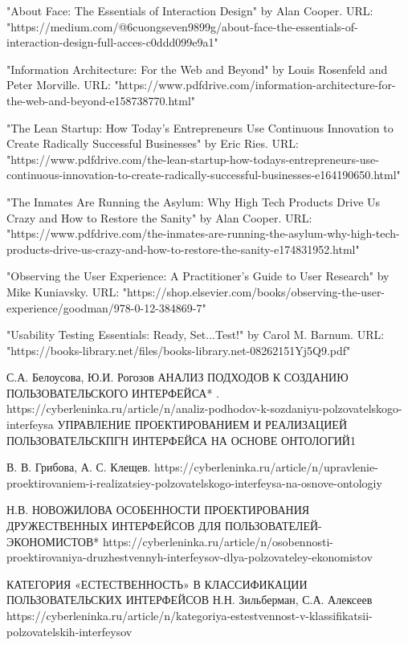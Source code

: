\documentclass{article}
\begin{document}
"About Face: The Essentials of Interaction Design" by Alan Cooper. URL: "https://medium.com/@6cuongseven9899g/about-face-the-essentials-of-interaction-design-full-acces-c0ddd099e9a1"

"Information Architecture: For the Web and Beyond" by Louis Rosenfeld and Peter Morville. URL: "https://www.pdfdrive.com/information-architecture-for-the-web-and-beyond-e158738770.html"

"The Lean Startup: How Today's Entrepreneurs Use Continuous Innovation to Create Radically Successful Businesses" by Eric Ries. URL:
"https://www.pdfdrive.com/the-lean-startup-how-todays-entrepreneurs-use-continuous-innovation-to-create-radically-successful-businesses-e164190650.html"

"The Inmates Are Running the Asylum: Why High Tech Products Drive Us Crazy and How to Restore the Sanity" by Alan Cooper. URL: "https://www.pdfdrive.com/the-inmates-are-running-the-asylum-why-high-tech-products-drive-us-crazy-and-how-to-restore-the-sanity-e174831952.html"

"Observing the User Experience: A Practitioner's Guide to User Research" by Mike Kuniavsky. URL: "https://shop.elsevier.com/books/observing-the-user-experience/goodman/978-0-12-384869-7"

"Usability Testing Essentials: Ready, Set...Test!" by Carol M. Barnum. URL: "https://books-library.net/files/books-library.net-08262151Yj5Q9.pdf"


С.А. Белоусова, Ю.И. Рогозов
АНАЛИЗ ПОДХОДОВ К СОЗДАНИЮ ПОЛЬЗОВАТЕЛЬСКОГО
ИНТЕРФЕЙСА* . https://cyberleninka.ru/article/n/analiz-podhodov-k-sozdaniyu-polzovatelskogo-interfeysa
УПРАВЛЕНИЕ ПРОЕКТИРОВАНИЕМ И РЕАЛИЗАЦИЕЙ ПОЛЬЗОВАТЕЛЬСКПГН ИНТЕРФЕЙСА НА ОСНОВЕ ОНТОЛОГИЙ1

В. В. Грибова, А. С. Клещев. https://cyberleninka.ru/article/n/upravlenie-proektirovaniem-i-realizatsiey-polzovatelskogo-interfeysa-na-osnove-ontologiy

 Н.В. НОВОЖИЛОВА
ОСОБЕННОСТИ ПРОЕКТИРОВАНИЯ ДРУЖЕСТВЕННЫХ ИНТЕРФЕЙСОВ ДЛЯ ПОЛЬЗОВАТЕЛЕЙ-ЭКОНОМИСТОВ*
https://cyberleninka.ru/article/n/osobennosti-proektirovaniya-druzhestvennyh-interfeysov-dlya-polzovateley-ekonomistov

КАТЕГОРИЯ «ЕСТЕСТВЕННОСТЬ» В КЛАССИФИКАЦИИ ПОЛЬЗОВАТЕЛЬСКИХ ИНТЕРФЕЙСОВ
Н.Н. Зильберман, С.А. Алексеев
https://cyberleninka.ru/article/n/kategoriya-estestvennost-v-klassifikatsii-polzovatelskih-interfeysov
\end{document}
